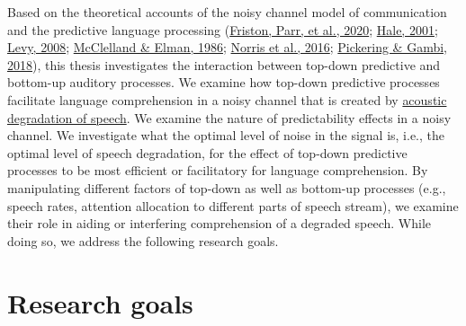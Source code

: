 \documentclass[a4paper, nobind]{templates/ociamthesis}
\begin{document}
Based on the theoretical accounts of the noisy channel model of communication and the predictive language processing (\protect\hyperlink{ref-Friston2020}{Friston, Parr, et al., 2020}; \protect\hyperlink{ref-Hale2001}{Hale, 2001}; \protect\hyperlink{ref-Levy2008}{Levy, 2008}; \protect\hyperlink{ref-Mcclelland1986}{McClelland \& Elman, 1986}; \protect\hyperlink{ref-Norris2016}{Norris et al., 2016}; \protect\hyperlink{ref-Pickering2018}{Pickering \& Gambi, 2018}),
this thesis investigates the interaction between top-down predictive and bottom-up auditory processes.
We examine how top-down predictive processes facilitate language comprehension in a noisy channel that is created by \protect\hyperlink{speech-processing}{acoustic degradation of speech}.
We examine the nature of predictability effects in a noisy channel.
We investigate what the optimal level of noise in the signal is, i.e., the optimal level of speech degradation,
for the effect of top-down predictive processes to be most efficient or facilitatory for language comprehension.
By manipulating different factors of top-down as well as bottom-up processes (e.g., speech rates, attention allocation to different parts of speech stream),
we examine their role in aiding or interfering comprehension of a degraded speech.
While doing so, we address the following research goals.

\hypertarget{research-goals}{%
\section{Research goals}\label{research-goals}}
\end{document}
